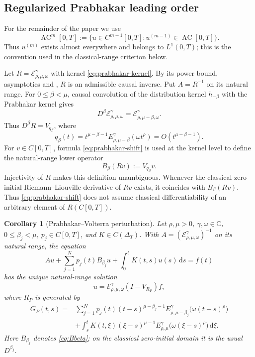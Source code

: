 \documentclass[11pt]{article}
\numberwithin{equation}{section}
\newtheorem{corollary}{Corollary}
\theoremstyle{definition}
\theoremstyle{remark}
\newcommand{\C}{\mathbb C}
\newcommand{\E}{\mathcal E}
\newcommand{\dd}{\,\mathrm d}
\newcommand{\AC}{\operatorname{AC}}
\begin{document}
\subsection{Regularized Prabhakar leading order}

For the remainder of the paper we use
\[
\AC^m[0,T]
:=\{u\in C^{m-1}[0,T]:u^{(m-1)}\in\AC[0,T]\}.
\]
Thus $u^{(m)}$ exists almost everywhere and belongs to $L^1(0,T)$; this is the convention used in the classical-range criterion below.

Let $R=\E_{\rho,\mu,\omega}^{\gamma}$ with kernel \eqref{eq:prabhakar-kernel}. By its power bound, asymptotics and , $R$ is an admissible causal inverse. Put $A=R^{-1}$ on its natural range. For $0\le\beta<\mu$, causal convolution of the distribution kernel $h_{-\beta}$ with the Prabhakar kernel gives
\begin{equation}
D^\beta\E_{\rho,\mu,\omega}^{\gamma}
=\E_{\rho,\mu-\beta,\omega}^{\gamma}.
\label{eq:prabhakar-shift}
\end{equation}
Thus $D^\beta R=V_{q_\beta}$, where
\begin{equation*}
q_\beta(t)=t^{\mu-\beta-1}E_{\rho,\mu-\beta}^{\gamma}(\omega t^\rho)
=O(t^{\mu-\beta-1}).
\end{equation*}
For $v\in C[0,T]$, formula \eqref{eq:prabhakar-shift} is used at the kernel level to define the natural-range lower operator
\begin{equation}
B_\beta(Rv):=V_{q_\beta}v.
\label{eq:Bbeta}
\end{equation}
Injectivity of $R$ makes this definition unambiguous. Whenever the classical zero-initial Riemann--Liouville derivative of $Rv$ exists, it coincides with $B_\beta(Rv)$. Thus \eqref{eq:prabhakar-shift} does not assume classical differentiability of an arbitrary element of $R(C[0,T])$.

\begin{corollary}[Prabhakar--Volterra perturbation]\label{cor:prabhakar}
Let $\rho,\mu>0$, $\gamma,\omega\in\C$, $0\le\beta_j<\mu$, $p_j\in C[0,T]$, and $K\in C(\Delta_T)$. With $A=(\E_{\rho,\mu,\omega}^{\gamma})^{-1}$ on its natural range, the equation
\begin{equation}
Au+\sum_{j=1}^{N}p_j(t)B_{\beta_j}u
+\int_0^tK(t,s)u(s)\dd s=f(t)
\end{equation}
has the unique natural-range solution
\begin{equation}
u=\E_{\rho,\mu,\omega}^{\gamma}(I-V_{R_P})f,
\end{equation}
where $R_P$ is generated by
\begin{align}
G_P(t,s)
={}&\sum_{j=1}^{N}p_j(t)(t-s)^{\mu-\beta_j-1}
E_{\rho,\mu-\beta_j}^{\gamma}\bigl(\omega(t-s)^\rho\bigr)\\
&+\int_s^tK(t,\xi)(\xi-s)^{\mu-1}
E_{\rho,\mu}^{\gamma}\bigl(\omega(\xi-s)^\rho\bigr)\dd\xi.
\end{align}
Here $B_{\beta_j}$ denotes \eqref{eq:Bbeta}; on the classical zero-initial domain it is the usual $D^{\beta_j}$.
\end{corollary}
\end{document}
